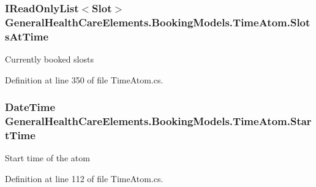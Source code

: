 \subsubsection[{\texorpdfstring{Slots\+At\+Time}{SlotsAtTime}}]{\setlength{\rightskip}{0pt plus 5cm}I\+Read\+Only\+List$<${\bf Slot}$>$ General\+Health\+Care\+Elements.\+Booking\+Models.\+Time\+Atom.\+Slots\+At\+Time\hspace{0.3cm}{\ttfamily [get]}}\hypertarget{class_general_health_care_elements_1_1_booking_models_1_1_time_atom_a2bed78658e9887234dca117a78e12df0}{}\label{class_general_health_care_elements_1_1_booking_models_1_1_time_atom_a2bed78658e9887234dca117a78e12df0}


Currently booked slosts 



Definition at line 350 of file Time\+Atom.\+cs.

\subsubsection[{\texorpdfstring{Start\+Time}{StartTime}}]{\setlength{\rightskip}{0pt plus 5cm}Date\+Time General\+Health\+Care\+Elements.\+Booking\+Models.\+Time\+Atom.\+Start\+Time\hspace{0.3cm}{\ttfamily [get]}}\hypertarget{class_general_health_care_elements_1_1_booking_models_1_1_time_atom_ad6e422ef0c2cb03cf1dec9861a40f544}{}\label{class_general_health_care_elements_1_1_booking_models_1_1_time_atom_ad6e422ef0c2cb03cf1dec9861a40f544}


Start time of the atom 



Definition at line 112 of file Time\+Atom.\+cs.

